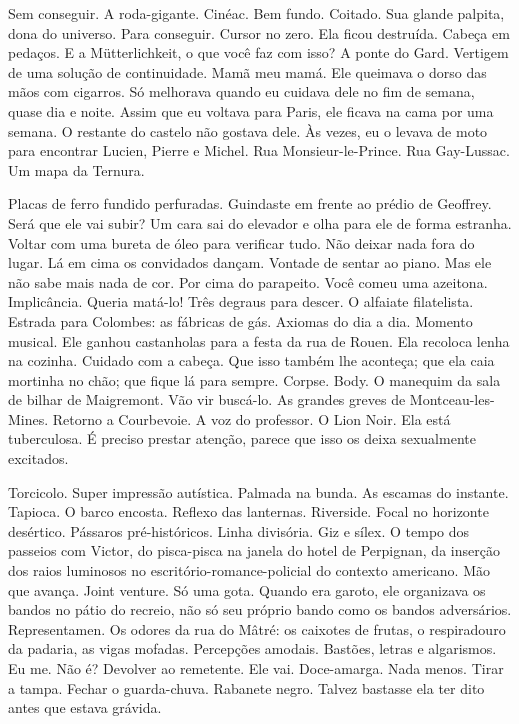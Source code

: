 Sem conseguir. A roda-gigante. Cinéac. Bem fundo. Coitado. Sua glande
palpita, dona do universo. Para conseguir. Cursor no zero. Ela ficou
destruída. Cabeça em pedaços. E a Mütterlichkeit, o que você faz com
isso? A ponte do Gard. Vertigem de uma solução de continuidade. Mamã meu
mamá. Ele queimava o dorso das mãos com cigarros. Só melhorava quando eu
cuidava dele no fim de semana, quase dia e noite. Assim que eu voltava
para Paris, ele ficava na cama por uma semana. O restante do castelo não
gostava dele. Às vezes, eu o levava de moto para encontrar Lucien,
Pierre e Michel. Rua Monsieur-le-Prince. Rua Gay-Lussac. Um mapa da
Ternura.

Placas de ferro fundido perfuradas. Guindaste em frente ao prédio de
Geoffrey. Será que ele vai subir? Um cara sai do elevador e olha para
ele de forma estranha. Voltar com uma bureta de óleo para verificar
tudo. Não deixar nada fora do lugar. Lá em cima os convidados dançam.
Vontade de sentar ao piano. Mas ele não sabe mais nada de cor. Por cima
do parapeito. Você comeu uma azeitona. Implicância. Queria matá-lo! Três
degraus para descer. O alfaiate filatelista. Estrada para Colombes: as
fábricas de gás. Axiomas do dia a dia. Momento musical. Ele ganhou
castanholas para a festa da rua de Rouen. Ela recoloca lenha na cozinha.
Cuidado com a cabeça. Que isso também lhe aconteça; que ela caia
mortinha no chão; que fique lá para sempre. Corpse. Body. O manequim da
sala de bilhar de Maigremont. Vão vir buscá-lo. As grandes greves de
Montceau-les-Mines. Retorno a Courbevoie. A voz do professor. O Lion
Noir. Ela está tuberculosa. É preciso prestar atenção, parece que isso
os deixa sexualmente excitados.

Torcicolo. Super impressão autística. Palmada na bunda. As escamas do
instante. Tapioca. O barco encosta. Reflexo das lanternas. Riverside.
Focal no horizonte desértico. Pássaros pré-históricos. Linha divisória.
Giz e sílex. O tempo dos passeios com Victor, do pisca-pisca na janela
do hotel de Perpignan, da inserção dos raios luminosos no
escritório-romance-policial do contexto americano. Mão que avança. Joint
venture. Só uma gota. Quando era garoto, ele organizava os bandos no
pátio do recreio, não só seu próprio bando como os bandos adversários.
Representamen. Os odores da rua do Mâtré: os caixotes de frutas, o
respiradouro da padaria, as vigas mofadas. Percepções amodais. Bastões,
letras e algarismos. Eu me. Não é? Devolver ao remetente. Ele vai.
Doce-amarga. Nada menos. Tirar a tampa. Fechar o guarda-chuva. Rabanete
negro. Talvez bastasse ela ter dito antes que estava grávida.

